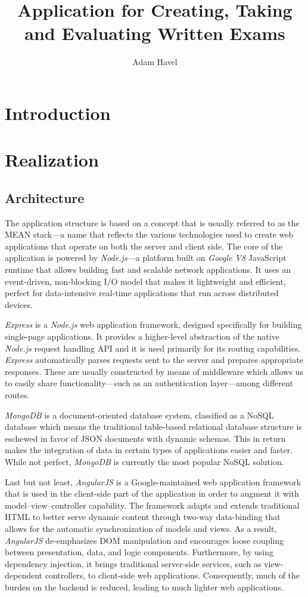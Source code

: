 \documentclass[thesis=M,english,hidelinks]{FITthesis}[2012/10/20]
\title{Application for Creating, Taking and Evaluating Written Exams}
\author{Adam Havel}
\begin{document}
\chapter{Introduction}


\chapter{Realization}

  \section{Architecture}

The application structure is based on a concept that is usually referred to as the MEAN stack---a name that reflects the various technologies used to create web applications that operate on both the server and client side. The core of the application is powered by \textit{Node.js}---a platform built on \textit{Google V8} JavaScript runtime that allows building fast and scalable network applications. It uses an event-driven, non-blocking I/O model that makes it lightweight and efficient, perfect for data-intensive real-time applications that run across distributed devices.

\textit{Express} is a \textit{Node.js} web application framework, designed specifically for building single-page applications. It provides a higher-level abstraction of the native \textit{Node.js} request handling API and it is used primarily for its routing capabilities. \textit{Express} automatically parses requests sent to the server and prepares appropriate responses. These are usually constructed by means of middleware which allows us to easily share functionality---such as an authentication layer---among different routes.

\textit{MongoDB} is a document-oriented database system, classified as a NoSQL database which means the traditional table-based relational database structure is eschewed in favor of JSON documents with dynamic schemas. This in return makes the integration of data in certain types of applications easier and faster. While not perfect, \textit{MongoDB} is currently the most popular NoSQL solution.

Last but not least, \textit{AngularJS} is a Google-maintained web application framework that is used in the client-side part of the application in order to augment it with model–view–controller capability. The framework adapts and extends traditional HTML to better serve dynamic content through two-way data-binding that allows for the automatic synchronization of models and views. As a result, \textit{AngularJS} de-emphasizes DOM manipulation and encourages loose coupling between presentation, data, and logic components. Furthermore, by using dependency injection, it brings traditional server-side services, such as view-dependent controllers, to client-side web applications. Consequently, much of the burden on the backend is reduced, leading to much lighter web applications.
\end{document}
